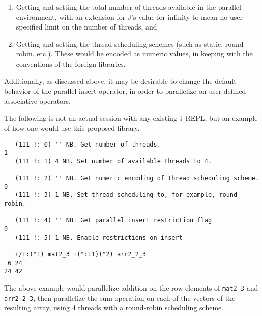 \begin{enumerate}
    \item Getting and setting the total number of threads available in the parallel environment,
        with an extension for J's value for infinity to mean no user-specified limit on the number of threads, and
    \item Getting and setting the thread scheduling schemes (such as static, round-robin, etc.).
        These would be encoded as numeric values, in keeping with the conventions of the foreign libraries.
\end{enumerate}

Additionally, as discussed above, it may be desirable to change 
the default behavior of the parallel insert operator, 
in order to parallelize on user-defined associative operators.

The following is not an actual session with any existing J REPL, 
but an example of how one would use this proposed library.

\begin{singlespacing}
\begin{small}
\begin{verbatim}
   (111 !: 0) '' NB. Get number of threads.
1
   (111 !: 1) 4 NB. Set number of available threads to 4.

   (111 !: 2) '' NB. Get numeric encoding of thread scheduling scheme.
0
   (111 !: 3) 1 NB. Set thread scheduling to, for example, round robin.

   (111 !: 4) '' NB. Get parallel insert restriction flag
0
   (111 !: 5) 1 NB. Enable restrictions on insert

   +/::("1) mat2_3 +("::1)("2) arr2_2_3
 6 24
24 42
\end{verbatim}
\end{small}
\end{singlespacing}

The above example would parallelize addition on the row elements of \texttt{mat2\_3} and \texttt{arr2\_2\_3},
then parallelize the sum operation on each of the vectors of the resulting array, 
using 4 threads with a round-robin scheduling scheme.
